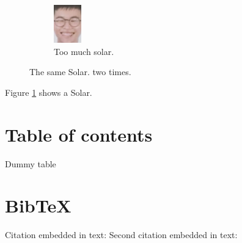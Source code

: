 \documentclass{article}
\begin{document}
\begin{figure}[h!]
\begin{subfigure}[b]{0.5\linewidth}
\includegraphics[width=\linewidth]{assets/solar.png}
\caption{Too much solar.}
\end{subfigure}

\caption{The same Solar. two times.}
\label{fig:solar1}
\end{figure}

Figure \ref{fig:solar1} shows a Solar.

\section{Table of contents}
\begin{table}
\caption{Dummy table}
\end{table}


\section{BibTeX}
Citation embedded in text: \autocite[1]{DUMMY:1}
Second citation embedded in text: \autocite[1]{WEBSITE:1}
\printbibliography
\end{document}
